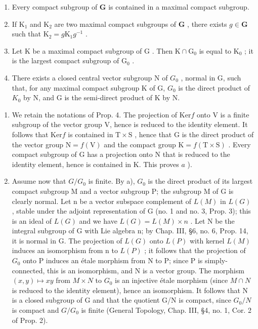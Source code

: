 \begin{enumerate}
\def\labelenumi{(\roman{enumi})}
\item
  Every compact subgroup of \(\mathbf{G}\) is contained in a maximal compact subgroup.
\item
  If \(\mathrm{K}_1\) and \(\mathrm{K}_2\) are two maximal compact subgroups of \(\mathbf{G}\) , there exists \(g \in \mathbf{G}\) such that \(\mathrm{K}_2 = g\mathrm{K}_1g^{-1}\) .
\item
  Let \(\mathrm{K}\) be a maximal compact subgroup of \(\mathrm{G}\) . Then \(\mathrm{K} \cap \mathrm{G}_0\) is equal to \(\mathrm{K}_0\) ; it is the largest compact subgroup of \(\mathrm{G}_0\) .
\item
  There exists a closed central vector subgroup N of \(G_{0}\) , normal in G, such that, for any maximal compact subgroup K of G, \(G_{0}\) is the direct product of \(K_{0}\) by N, and G is the semi-direct product of K by N.
\end{enumerate}

\begin{enumerate}
\def\labelenumi{\alph{enumi})}
\item
  We retain the notations of Prop. 4. The projection of \(\mathrm{Ker}f\) onto V is a finite subgroup of the vector group V, hence is reduced to the identity element. It follows that \(\mathrm{Ker}f\) is contained in \(\mathrm{T} \times \mathrm{S}\) , hence that G is the direct product of the vector group \(\mathrm{N} = f(\mathrm{V})\) and the compact group \(\mathrm{K} = f(\mathrm{T} \times \mathrm{S})\) . Every compact subgroup of G has a projection onto N that is reduced to the identity element, hence is contained in K. This proves \(a\) ).
\item
  Assume now that \(G/G_{0}\) is finite. By a), \(G_{0}\) is the direct product of its largest compact subgroup M and a vector subgroup P; the subgroup M of G is clearly normal. Let n be a vector subspace complement of \(L(M)\) in \(L(G)\) , stable under the adjoint representation of G (no. 1 and no. 3, Prop. 3); this is an ideal of \(L(G)\) and we have \(L(G) = L(M) \times n\) . Let N be the integral subgroup of G with Lie algebra n; by Chap. III, §6, no. 6, Prop. 14, it is normal in G. The projection of \(L(G)\) onto \(L(P)\) with kernel \(L(M)\) induces an isomorphism from n to \(L(P)\) ; it follows that the projection of \(G_{0}\) onto P induces an étale morphism from N to P; since P is simply-connected, this is an isomorphism, and N is a vector group. The morphism \((x, y) \mapsto xy\) from \(M \times N\) to \(G_{0}\) is an injective étale morphism (since \(M \cap N\) is reduced to the identity element), hence an isomorphism. It follows that N is a closed subgroup of G and that the quotient G/N is compact, since \(G_{0}/N\) is compact and \(G/G_{0}\) is finite (General Topology, Chap. III, §4, no. 1, Cor. 2 of Prop. 2).
\end{enumerate}


